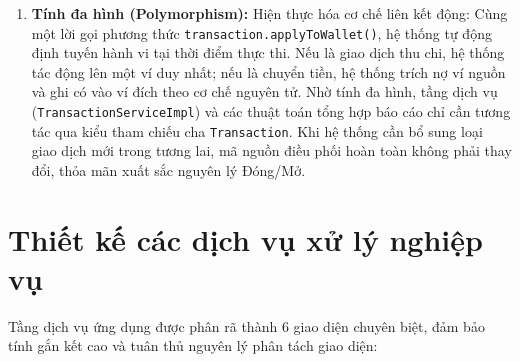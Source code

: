 \documentclass[a4paper,12pt]{report}
\newcommand{\passthrough}[1]{#1}
\begin{document}
\begin{enumerate}
\item
  \textbf{Tính đa hình (Polymorphism):} Hiện thực hóa cơ chế liên kết động: Cùng một lời gọi phương thức \passthrough{\lstinline!transaction.applyToWallet()!}, hệ thống tự động định tuyến hành vi tại thời điểm thực thi. Nếu là giao dịch thu chi, hệ thống tác động lên một ví duy nhất; nếu là chuyển tiền, hệ thống trích nợ ví nguồn và ghi có vào ví đích theo cơ chế nguyên tử. Nhờ tính đa hình, tầng dịch vụ (\passthrough{\lstinline!TransactionServiceImpl!}) và các thuật toán tổng hợp báo cáo chỉ cần tương tác qua kiểu tham chiếu cha \passthrough{\lstinline!Transaction!}. Khi hệ thống cần bổ sung loại giao dịch mới trong tương lai, mã nguồn điều phối hoàn toàn không phải thay đổi, thỏa mãn xuất sắc nguyên lý Đóng/Mở.
\end{enumerate}

\section{Thiết kế các dịch vụ xử lý nghiệp
vụ}\label{thiux1ebft-kux1ebf-cuxe1c-dux1ecbch-vux1ee5-xux1eed-luxfd-nghiux1ec7p-vux1ee5}

Tầng dịch vụ ứng dụng được phân rã thành 6 giao diện chuyên biệt, đảm
bảo tính gắn kết cao và tuân thủ nguyên lý phân tách giao diện:
\end{document}
